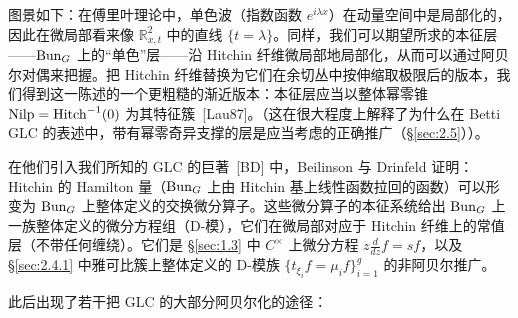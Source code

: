 图景如下：在傅里叶理论中，单色波（指数函数 $e^{i\lambda x}$）在动量空间中是局部化的，因此在微局部看来像 $\mathbb{R}^{2}_{x,t}$ 中的直线 $\{t=\lambda\}$。同样，我们可以期望所求的本征层——$\operatorname{Bun}_{G}$ 上的“单色”层——沿 Hitchin 纤维微局部地局部化，从而可以通过阿贝尔对偶来把握。把 Hitchin 纤维替换为它们在余切丛中按伸缩取极限后的版本，我们得到这一陈述的一个更粗糙的渐近版本：本征层应当以整体幂零锥 $\operatorname{Nilp}=\operatorname{Hitch}^{-1}(0)$ 为其特征簇~[Lau87]。（这在很大程度上解释了为什么在 Betti GLC 的表述中，带有幂零奇异支撑的层是应当考虑的正确推广（\S\ref{sec:2.5}））。

在他们引入我们所知的 GLC 的巨著~[BD] 中，Beilinson 与 Drinfeld 证明：Hitchin 的 Hamilton 量（$\operatorname{Bun}_{G}$ 上由 Hitchin 基上线性函数拉回的函数）可以形变为 $\operatorname{Bun}_{G}$ 上整体定义的交换微分算子。这些微分算子的本征系统给出 $\operatorname{Bun}_{G}$ 上一族整体定义的微分方程组（D-模），它们在微局部对应于 Hitchin 纤维上的常值层（不带任何缠绕）。它们是 \S\ref{sec:1.3} 中 $C^{\times}$ 上微分方程 $z\frac{d}{dz}f=sf$，以及 \S\ref{sec:2.4.1} 中雅可比簇上整体定义的 D-模族 $\{t_{\xi_{i}}f=\mu_{i}f\}_{i=1}^{g}$ 的非阿贝尔推广。

此后出现了若干把 GLC 的大部分阿贝尔化的途径：

